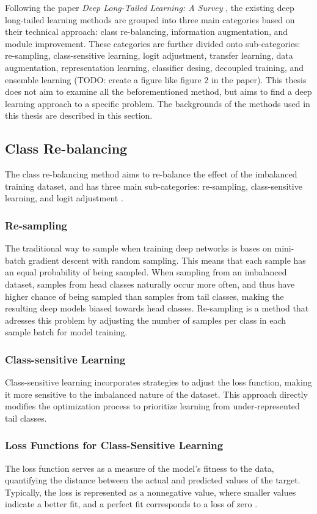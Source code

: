 Following the paper \textit{Deep Long-Tailed Learning: A Survey} \cite{zhang2023deep}, the existing deep long-tailed learning methods are grouped into three main categories based on their technical approach: class re-balancing, information augmentation, and module improvement. These categories are further divided onto sub-categories: re-sampling, class-sensitive learning, logit adjustment, transfer learning, data augmentation, representation learning, classifier desing, decoupled training, and ensemble learning (TODO: create a figure like figure 2 in the paper). This thesis does not aim to examine all the beforementioned method, but aims to find a deep learning approach to a specific problem. The backgrounds of the methods used in this thesis are described in this section.

\subsection{Class Re-balancing}
The class re-balancing method aims to re-balance the effect of the imbalanced training dataset, and has three main sub-categories: re-sampling, class-sensitive learning, and logit adjustment \cite{zhang2023deep}. 

\subsubsection{Re-sampling}
The traditional way to sample when training deep networks is bases on mini-batch gradient descent with random sampling. This means that each sample has an equal probability of being sampled. When sampling from an imbalanced dataset, samples from head classes naturally occur more often, and thus have higher chance of being sampled than samples from tail classes, making the resulting deep models biased towards head classes. Re-sampling is a method that adresses this problem by adjusting the number of samples per class in each sample batch for model training. 

\subsubsection{Class-sensitive Learning}
Class-sensitive learning incorporates strategies to adjust the loss function, making it more sensitive to the imbalanced nature of the dataset. This approach directly modifies the optimization process to prioritize learning from under-represented tail classes.


\subsubsection{Loss Functions for Class-Sensitive Learning}
The loss function serves as a measure of the model's fitness to the data, quantifying the distance between the actual and predicted values of the target. Typically, the loss is represented as a nonnegative value, where smaller values indicate a better fit, and a perfect fit corresponds to a loss of zero \cite{zhang2023dive}.

